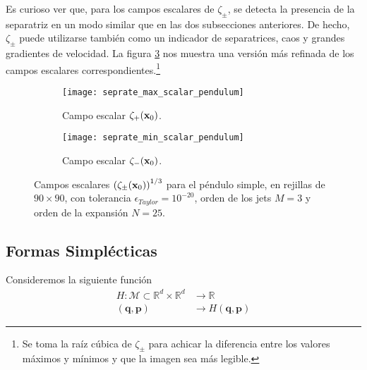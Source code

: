 Es curioso ver que, para los campos escalares de $\zeta_\pm$, se detecta la presencia de la separatriz en un modo similar que en las dos subsecciones anteriores. De hecho, $\zeta_\pm$ puede utilizarse también como un indicador de separatrices, caos y grandes gradientes de velocidad. La figura \ref{fig:seprate_scalar_pendulum} nos muestra una versión más refinada de los campos escalares correspondientes.\footnote{Se toma la raíz cúbica de $\zeta_\pm$ para achicar la diferencia entre los valores máximos y mínimos y que la imagen sea más legible.} 

\begin{figure}[h!]
\centering
\begin{subfigure}{0.49\textwidth}
	\centering
	\texttt{[image: seprate\_max\_scalar\_pendulum]}
	\caption{Campo escalar $\zeta_+(\mathbf{x}_0)$.}
	\label{fig:seprate_max_scalar_pendulum}
\end{subfigure}
%
\begin{subfigure}{0.49\textwidth}
	\centering
	\texttt{[image: seprate\_min\_scalar\_pendulum]}
	\caption{Campo escalar $\zeta_-(\mathbf{x}_0)$.}
	\label{fig:seprate_min_scalar_pendulum}
\end{subfigure}
\caption{ Campos escalares $\left( \zeta_\pm(\mathbf{x}_0) \right)^{1/3}$ para el péndulo simple, en rejillas de $90\times 90$, con tolerancia $\epsilon_{Taylor} = 10^{-20}$, orden de los jets $M=3$ y orden de la expansión $N=25$. }
\label{fig:seprate_scalar_pendulum}
\end{figure}


\subsection{Formas Simplécticas}
\label{sec:formas-simplecticas}

Consideremos la siguiente función
\begin{align*}
H: \mathcal{M} \subset \mathbb{R}^d\times\mathbb{R}^d &\to \mathbb{R} \\ 
	(\mathbf{q},\mathbf{p}) &\to H(\mathbf{q},\mathbf{p})
\end{align*}

